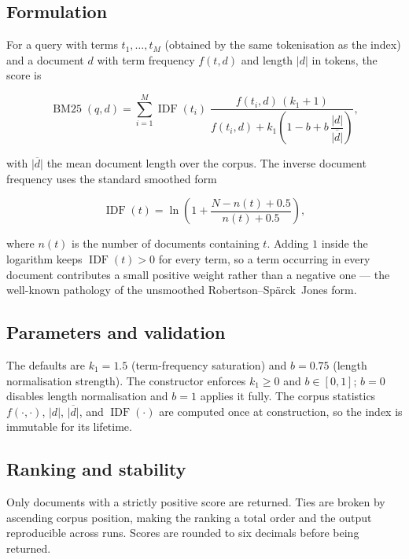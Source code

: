 \subsection*{Formulation}

For a query with terms $t_1,\dots,t_M$ (obtained by the same tokenisation as
the index) and a document $d$ with term frequency $f(t,d)$ and length $|d|$ in
tokens, the score is

\begin{equation}
\operatorname{BM25}(q,d) = \sum_{i=1}^{M}
\operatorname{IDF}(t_i)\;
\frac{f(t_i,d)\,(k_1 + 1)}
     {f(t_i,d) + k_1\left(1 - b + b\,\dfrac{|d|}{\overline{|d|}}\right)},
\end{equation}

with $\overline{|d|}$ the mean document length over the corpus. The inverse
document frequency uses the standard smoothed form

\begin{equation}
\operatorname{IDF}(t) = \ln\!\left(1 + \frac{N - n(t) + 0.5}{n(t) + 0.5}\right),
\end{equation}

where $n(t)$ is the number of documents containing $t$. Adding $1$ inside the
logarithm keeps $\operatorname{IDF}(t) > 0$ for every term, so a term occurring
in every document contributes a small positive weight rather than a negative
one --- the well-known pathology of the unsmoothed Robertson--Sp\"arck~Jones
form.

\subsection*{Parameters and validation}

The defaults are $k_1 = 1.5$ (term-frequency saturation) and $b = 0.75$ (length
normalisation strength). The constructor enforces $k_1 \geq 0$ and
$b \in [0,1]$; $b = 0$ disables length normalisation and $b = 1$ applies it
fully. The corpus statistics $f(\cdot,\cdot)$, $|d|$, $\overline{|d|}$, and
$\operatorname{IDF}(\cdot)$ are computed once at construction, so the index is
immutable for its lifetime.

\subsection*{Ranking and stability}

Only documents with a strictly positive score are returned. Ties are broken by
ascending corpus position, making the ranking a total order and the output
reproducible across runs. Scores are rounded to six decimals before being
returned.

